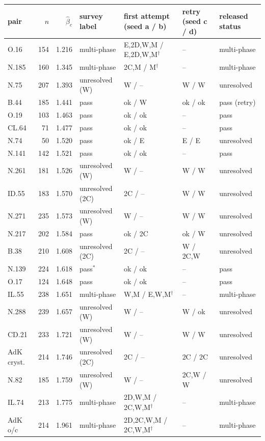 \begin{tabular}{lrrllll}
\toprule
pair & $n$ & $\hat\beta_c$ & survey label & first attempt (seed a / b) & retry (seed c / d) & released status \\
\midrule
O.16 & 154 & 1.216 & multi-phase & E,2D,W,M / E,2D,W,M$^\dagger$ & -- & multi-phase \\
N.185 & 160 & 1.345 & multi-phase & 2C,M / M$^\dagger$ & -- & multi-phase \\
N.75 & 207 & 1.393 & unresolved (W) & W / -- & W / W & unresolved \\
B.44 & 185 & 1.441 & pass & ok / W & ok / ok & pass (retry) \\
O.19 & 103 & 1.463 & pass & ok / ok & -- & pass \\
CL.64 & 71 & 1.477 & pass & ok / ok & -- & pass \\
N.74 & 50 & 1.520 & pass & ok / E & E / E & unresolved \\
N.141 & 142 & 1.521 & pass & ok / ok & -- & pass \\
N.261 & 181 & 1.526 & unresolved (W) & W / -- & W / W & unresolved \\
ID.55 & 183 & 1.570 & unresolved (2C) & 2C / -- & W / W & unresolved \\
N.271 & 235 & 1.573 & unresolved (W) & W / -- & W / W & unresolved \\
N.217 & 202 & 1.584 & pass & ok / 2C & ok / W & unresolved \\
B.38 & 210 & 1.608 & unresolved (2C) & 2C / -- & W / 2C,W & unresolved \\
N.139 & 224 & 1.618 & pass$^\ast$ & ok / ok & -- & pass \\
O.17 & 124 & 1.648 & pass & ok / ok & -- & pass \\
IL.55 & 238 & 1.651 & multi-phase & W,M / E,W,M$^\dagger$ & -- & multi-phase \\
N.288 & 239 & 1.657 & unresolved (W) & W / -- & W / ok & unresolved \\
CD.21 & 233 & 1.721 & unresolved (W) & W / -- & W / W & unresolved \\
AdK cryst. & 214 & 1.746 & unresolved (2C) & 2C / -- & 2C / 2C & unresolved \\
N.82 & 185 & 1.759 & unresolved (W) & W / -- & 2C,W / W & unresolved \\
IL.74 & 213 & 1.775 & multi-phase & 2D,W,M / 2C,W,M$^\dagger$ & -- & multi-phase \\
AdK o/c & 214 & 1.961 & multi-phase & 2D,2C,W,M / 2C,W,M$^\dagger$ & -- & multi-phase \\
\bottomrule
\end{tabular}
